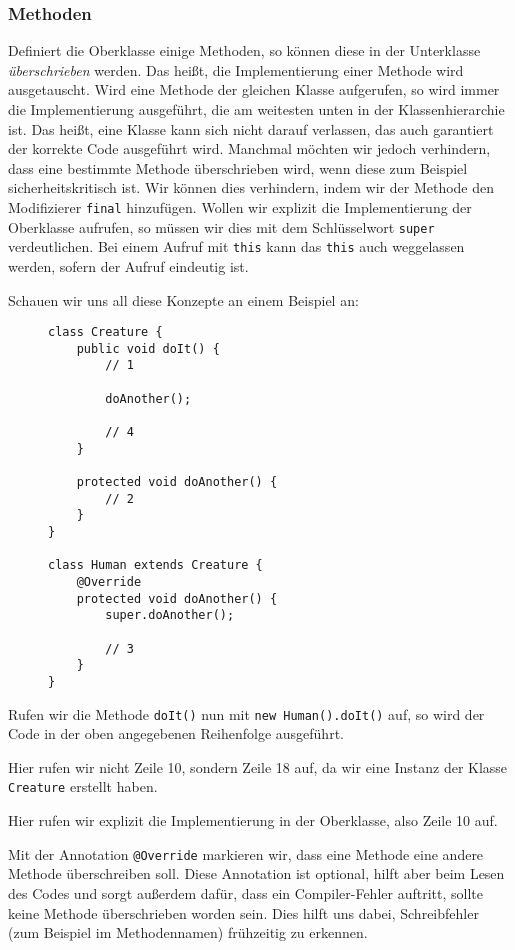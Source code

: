 	\subsubsection{Methoden} %
		Definiert die Oberklasse einige Methoden, so können diese in der Unterklasse \textit{überschrieben} werden. Das heißt, die Implementierung einer Methode wird ausgetauscht. Wird eine Methode der gleichen Klasse aufgerufen, so wird immer die Implementierung ausgeführt, die am weitesten unten in der Klassenhierarchie ist. Das heißt, eine Klasse kann sich nicht darauf verlassen, das auch garantiert der korrekte Code ausgeführt wird. Manchmal möchten wir jedoch verhindern, dass eine bestimmte Methode überschrieben wird, wenn diese zum Beispiel sicherheitskritisch ist. Wir können dies verhindern, indem wir der Methode den Modifizierer \lstinline|final| hinzufügen. Wollen wir explizit die Implementierung der Oberklasse aufrufen, so müssen wir dies mit dem Schlüsselwort \lstinline|super| verdeutlichen. Bei einem Aufruf mit \lstinline|this| kann das \lstinline|this| auch weggelassen werden, sofern der Aufruf eindeutig ist.
		
		Schauen wir uns all diese Konzepte an einem Beispiel an:
		\begin{figure}[H]
			\centering
			\begin{lstlisting}
class Creature {
	public void doIt() {
		// 1

		doAnother();

		// 4
	}

	protected void doAnother() {
		// 2
	}
}

class Human extends Creature {
	@Override
	protected void doAnother() {
		super.doAnother();

		// 3
	}
}
\end{lstlisting}
		\end{figure}
		Rufen wir die Methode \lstinline|doIt()| nun mit \lstinline|new Human().doIt()| auf, so wird der Code in der oben angegebenen Reihenfolge ausgeführt.
		\begin{description}[leftmargin = 2cm]
			\item[Zeile 5] Hier rufen wir nicht Zeile 10, sondern Zeile 18 auf, da wir eine Instanz der Klasse \lstinline|Creature| erstellt haben.
			\item[Zeile 17] Hier rufen wir explizit die Implementierung in der Oberklasse, also Zeile 10 auf.
		\end{description}
	
		Mit der Annotation \lstinline|@Override| markieren wir, dass eine Methode eine andere Methode überschreiben soll. Diese Annotation ist optional, hilft aber beim Lesen des Codes und sorgt außerdem dafür, dass ein Compiler-Fehler auftritt, sollte keine Methode überschrieben worden sein. Dies hilft uns dabei, Schreibfehler (zum Beispiel im Methodennamen) frühzeitig zu erkennen.
	

